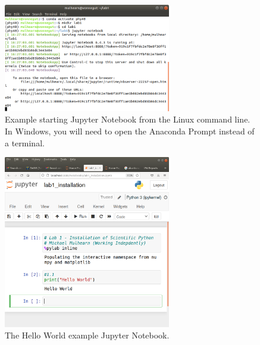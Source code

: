 \begin{figure}[htbp]
\begin{center}
\includegraphics[width=0.65\textwidth]{figs/install/jupyter_startup.png} 
\caption{Example starting Jupyter Notebook from the Linux command line.  In Windows, you will need to open the Anaconda Prompt instead of a terminal.}
\label{fig:jupyterstartup}
\end{center}
\end{figure}

\begin{figure}[htbp]
\begin{center}
\includegraphics[width=0.65\textwidth]{figs/install/jupyter_window.png} 
\caption{The Hello World example Jupyter Notebook.}
\label{fig:jupyterwindow}
\end{center}
\end{figure}

